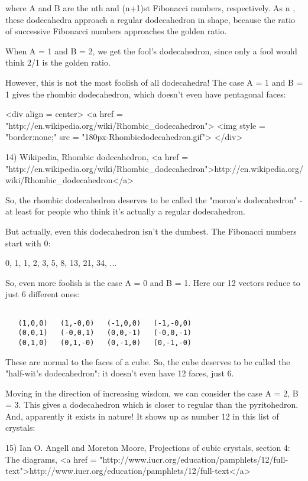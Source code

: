 where A and B are the nth and (n+1)st Fibonacci numbers, respectively.  
As n \to  \infty , these dodecahedra approach a regular dodecahedron
in shape, because the ratio of successive Fibonacci numbers approaches 
the golden ratio.

When A = 1 and B = 2, we get the fool's dodecahedron, since only a 
fool would think 2/1 is the golden ratio.  

However, this is not the most foolish of all dodecahedra!   The 
case A = 1 and B = 1 gives the rhombic dodecahedron, which doesn't
even have pentagonal faces:

<div align = center>
<a href = "http://en.wikipedia.org/wiki/Rhombic_dodecahedron">
<img style = "border:none;" src = "180px-Rhombicdodecahedron.gif">
</div>  


14) Wikipedia, Rhombic dodecahedron, 
<a href = "http://en.wikipedia.org/wiki/Rhombic_dodecahedron">http://en.wikipedia.org/wiki/Rhombic_dodecahedron</a>

So, the rhombic dodecahedron deserves to be called the "moron's 
dodecahedron" - at least for people who think it's actually a 
regular dodecahedron.

But actually, even this dodecahedron isn't the dumbest.  The 
Fibonacci numbers start with 0:

0, 1, 1, 2, 3, 5, 8, 13, 21, 34, ...

So, even more foolish is the case A = 0 and B = 1.  Here our
12 vectors reduce to just 6 different ones:


\begin{verbatim}

   (1,0,0)   (1,-0,0)   (-1,0,0)   (-1,-0,0)
   (0,0,1)   (-0,0,1)   (0,0,-1)   (-0,0,-1)
   (0,1,0)   (0,1,-0)   (0,-1,0)   (0,-1,-0)
\end{verbatim}
    

These are normal to the faces of a cube.  So, the cube 
deserves to be called the "half-wit's dodecahedron": it 
doesn't even have 12 faces, just 6.

Moving in the direction of increasing wisdom, we can consider 
the case A = 2, B = 3.  This gives a dodecahedron which is
closer to regular than the pyritohedron.  And, apparently it
exists in nature!  It shows up as number 12 in this list of crystals:

15) Ian O. Angell and Moreton Moore, Projections of cubic crystals,
section 4: The diagrams, 
<a href = "http://www.iucr.org/education/pamphlets/12/full-text">http://www.iucr.org/education/pamphlets/12/full-text</a>

